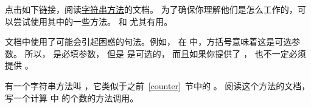 \begin{exercise}
  


点击如下链接，阅读\href{http://docs.python.org/3/library/stdtypes.html#string-methods}{字符串方法}的文档。  为了确保你理解他们是怎么工作的，可以尝试使用其中的一些方法。  和  尤其有用。


文档中使用了可能会引起困惑的句法。例如， 在  中，方括号意味着这是可选参数。 所以， 是必填参数， 但是  是可选的， 而且如果你提供了  ， 也不一定必须提供  。

  

\end{exercise}


\begin{exercise}
  


有一个字符串方法叫  ，它类似于之前~\ref{counter}~节中的  。 阅读这个方法的文档， 写一个计算  中  的个数的方法调用。


\end{exercise}


